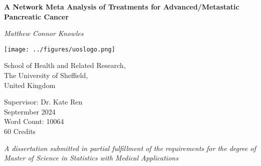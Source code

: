 \begin{titlepage}

    \begin{center}

        \vspace*{1.5cm}

        \textbf{\huge A Network Meta Analysis of Treatments for Advanced/Metastatic Pancreatic Cancer } 
        
        \vspace*{1.5cm}
        
        \textit{Matthew Connor Knowles}

        \vspace*{1.5cm}
    
        \texttt{[image: ../figures/uoslogo.png]}
        
        \vspace*{1.5cm}
        
        School of Health and Related Research, \\
        The University of Sheffield, \\
        United Kingdom \\

        \vspace*{0.5cm}

        Supervisor: Dr. Kate Ren \\

        Septermber 2024 \\

        Word Count: 10064\\

        60 Credits \\
        
        \vspace*{1.5cm}

        \textit{A dissertation submitted in partial fulfillment of the requirements for the degree of Master of Science in 
        Statistics with Medical Applications}
    \end{center}
    
\end{titlepage}
